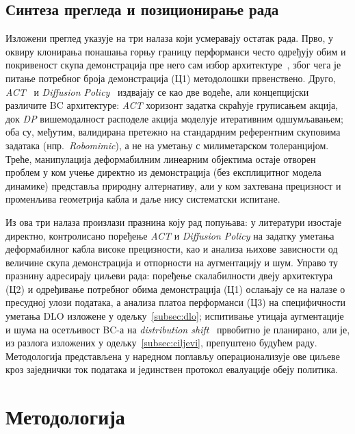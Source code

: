 \documentclass[12pt, a4paper]{article}
\begin{document}
\subsection{Синтеза прегледа и позиционирање рада}
\label{subsec:sinteza}

Изложени преглед указује на три налаза који усмеравају остатак рада.
Прво, у оквиру клонирања понашања горњу границу перформанси често одређују обим и покривеност скупа демонстрација пре него сам избор архитектуре~\cite{mandlekar2021robomimic, belkhale2023dataquality}, због чега је питање потребног броја демонстрација (Ц1) методолошки првенствено.
Друго, \textit{ACT}~\cite{zhao2023act} и \textit{Diffusion Policy}~\cite{chi2023diffusionpolicy} издвајају се као две водеће, али концепцијски различите BC архитектуре: \textit{ACT} хоризонт задатка скраћује груписањем акција, док \textit{DP} вишемодалност расподеле акција моделује итеративним одшумљавањем; оба су, међутим, валидирана претежно на стандардним референтним скуповима задатака (нпр.\ \textit{Robomimic}), а не на уметању с милиметарском толеранцијом.
Треће, манипулација деформабилним линеарним објектима остаје отворен проблем у ком учење директно из демонстрација (без експлицитног модела динамике) представља природну алтернативу, али у ком захтевана прецизност и променљива геометрија кабла и даље нису систематски испитане.

Из ова три налаза произлази празнина коју рад попуњава: у литератури изостаје директно, контролисано поређење \textit{ACT} и \textit{Diffusion Policy} на задатку уметања деформабилног кабла високе прецизности, као и анализа њихове зависности од величине скупа демонстрација и отпорности на аугментацију и шум.
Управо ту празнину адресирају циљеви рада: поређење скалабилности двеју архитектура (Ц2) и одређивање потребног обима демонстрација (Ц1) ослањају се на налазе о пресудној улози података, а анализа платоа перформанси (Ц3) на специфичности уметања DLO изложене у одељку~\ref{subsec:dlo}; испитивање утицаја аугментације и шума на осетљивост BC-а на \textit{distribution shift}~\cite{ross2011dagger} првобитно је планирано, али је, из разлога изложених у одељку~\ref{subsec:ciljevi}, препуштено будућем раду.
Методологија представљена у наредном поглављу операционализује ове циљеве кроз заједнички ток података и јединствен протокол евалуације обеју политика.

\section{Методологија}
\label{sec:metodologija}
\end{document}
